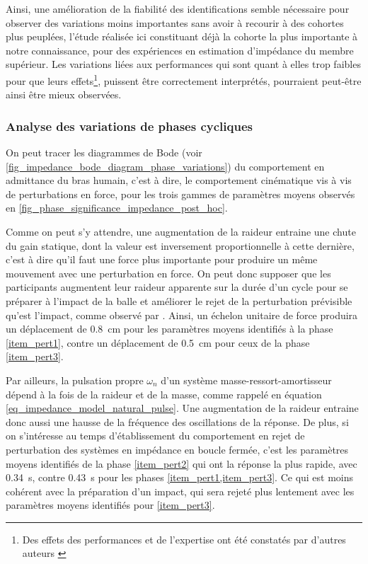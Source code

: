 
Ainsi, une amélioration de la fiabilité des identifications semble nécessaire pour observer des variations moins importantes sans avoir à recourir à des cohortes plus peuplées, l'étude réalisée ici constituant déjà la cohorte la plus importante à notre connaissance, pour des expériences en estimation d'impédance du membre supérieur. Les variations liées aux performances qui sont quant à elles trop faibles pour que leurs effets\footnote{Des effets des performances et de l'expertise ont été constatés par d'autres auteurs \parencite{erden_hand_2015}}, puissent être correctement interprétés, pourraient peut-être ainsi être mieux observées.

\subsubsection{Analyse des variations de phases cycliques} \label{chap4_sec_res_sub_discussion_2}

On peut tracer les diagrammes de Bode (voir \cref{fig_impedance_bode_diagram_phase_variations}) du comportement en admittance du bras humain, c'est à dire, le comportement cinématique vis à vis de perturbations en force, pour les trois gammes de paramètres moyens observés en \cref{fig_phase_significance_impedance_post_hoc}. 


\tikzexternaldisable

Comme on peut s'y attendre, une augmentation de la raideur entraine une chute du gain statique, dont la valeur est inversement proportionnelle à cette dernière, c'est à dire qu'il faut une force plus importante pour produire un même mouvement avec une perturbation en force. On peut donc supposer que les participants augmentent leur raideur apparente sur la durée d'un cycle pour se préparer à l'impact de la balle et améliorer le rejet de la perturbation prévisible qu'est l'impact, comme observé par \textcite{tsuji_bio-mimetic_2008}. Ainsi, un échelon unitaire de force produira un déplacement de \SI{0.8}{\centi\meter} pour les paramètres moyens identifiés à la phase \cref{item_pert1}, contre un déplacement de \SI{0.5}{\centi\meter} pour ceux de la phase \cref{item_pert3}.

Par ailleurs, la pulsation propre $\omega_n$ d'un système masse-ressort-amortisseur dépend à la fois de la raideur et de la masse, comme rappelé en équation \cref{eq_impedance_model_natural_pulse}. Une augmentation de la raideur entraine donc aussi une hausse de la fréquence des oscillations de la réponse. De plus, si on s'intéresse au temps d'établissement du comportement en rejet de perturbation des systèmes en impédance en boucle fermée, c'est les paramètres moyens identifiés de la phase \cref{item_pert2} qui ont la réponse la plus rapide, avec \SI{0.34}{\second}, contre \SI{0.43}{\second} pour les phases \cref{item_pert1,item_pert3}. Ce qui est moins cohérent avec la préparation d'un impact, qui sera rejeté plus lentement avec les paramètres moyens identifiés pour \cref{item_pert3}.

